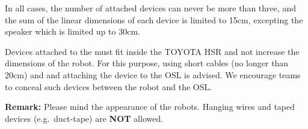 In all cases, the number of attached devices can never be more than three, and the sum of the linear dimensions of each device is limited to 15cm, excepting the speaker which is limited up to 30cm.

Devices attached to the  must fit inside the TOYOTA HSR  and not increase the dimensions of the robot.
For this purpose, using short cables (no longer than 20cm) and and attaching the device to the OSL is advised.
We encourage teams to conceal such devices between the robot and the OSL.

\noindent\textbf{Remark:} Please mind the appearance of the robots. Hanging wires and taped devices (e.g.~duct-tape) are \textbf{NOT} allowed.


